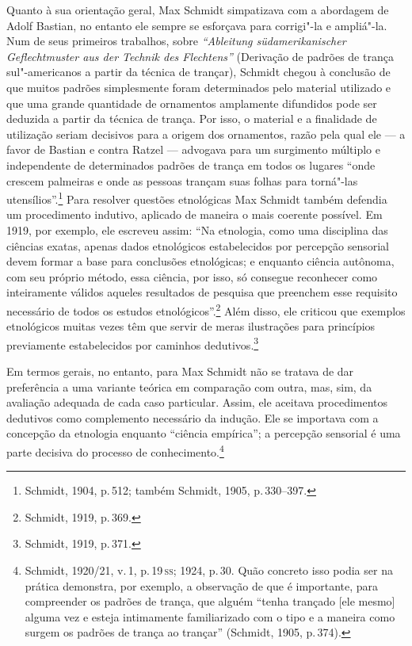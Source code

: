 Quanto à sua orientação geral, Max Schmidt simpatizava com a abordagem
de Adolf Bastian, no entanto ele sempre se esforçava para corrigi"-la e
ampliá"-la. Num de seus primeiros trabalhos, sobre \textit{``Ableitung
südamerikanischer Geflechtmuster aus der Technik des Flechtens''}
(Derivação de padrões de trança sul"-americanos a partir da técnica de
trançar), Schmidt chegou à conclusão de que muitos padrões simplesmente
foram determinados pelo material utilizado e que uma grande quantidade
de ornamentos amplamente difundidos pode ser deduzida a partir da
técnica de trança. Por isso, o material e a finalidade de utilização
seriam decisivos para a origem dos ornamentos, razão pela qual ele --- a
favor de Bastian e contra Ratzel --- advogava para um surgimento múltiplo
e independente de determinados padrões de trança em todos os lugares
``onde crescem palmeiras e onde as pessoas trançam suas folhas para
torná"-las utensílios''.\footnote{Schmidt, 1904, p.\,512; também Schmidt,
  1905, p.\,330--397.} Para resolver questões etnológicas Max Schmidt
também defendia um procedimento indutivo, aplicado de maneira o mais
coerente possível. Em 1919, por exemplo, ele escreveu assim: ``Na
etnologia, como uma disciplina das ciências exatas, apenas dados
etnológicos estabelecidos por percepção sensorial devem formar a base
para conclusões etnológicas; e enquanto ciência autônoma, com seu
próprio método, essa ciência, por isso, só consegue reconhecer como
inteiramente válidos aqueles resultados de pesquisa que preenchem esse
requisito necessário de todos os estudos etnológicos''.\footnote{Schmidt,
  1919, p.\,369.} Além disso, ele criticou que exemplos etnológicos
muitas vezes têm que servir de meras ilustrações para princípios
previamente estabelecidos por caminhos dedutivos.\footnote{Schmidt, 1919, p.\,371.}

Em termos gerais, no entanto, para Max Schmidt não se tratava de dar
preferência a uma variante teórica em comparação com outra, mas, sim,
da avaliação adequada de cada caso particular. Assim, ele aceitava
procedimentos dedutivos como complemento necessário da indução. Ele se
importava com a concepção da etnologia enquanto ``ciência empírica''; a
percepção sensorial é uma parte decisiva do processo de
conhecimento.\footnote{Schmidt, 1920/21, v.\,1, p.\,19\,\textsc{ss}; 1924, p.\,30.
  Quão concreto isso podia ser na prática demonstra, por exemplo, a
  observação de que é importante, para compreender os padrões de trança,
  que alguém ``tenha trançado {[}ele mesmo{]} alguma vez e esteja
  intimamente familiarizado com o tipo e a maneira como surgem os
  padrões de trança ao trançar'' (Schmidt, 1905, p.\,374).}

